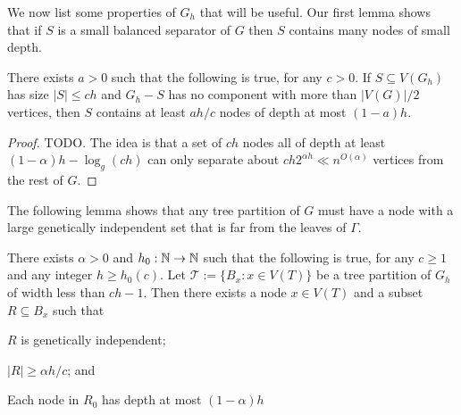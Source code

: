 \documentclass{patmorin}
\begin{document}
We now list some properties of $G_h$ that will be useful.  
Our first lemma shows that if $S$ is a small balanced separator of $G$ then $S$ contains many nodes of small depth.

\begin{lem}\label{small_depth_separator}
  There exists $a >0$ such that the following is true, for any $c>0$.
  If $S\subseteq V(G_h)$ has size $|S|\le ch$ and $G_h-S$ has no component with more than $|V(G)|/2$ vertices, then $S$ contains at least $ah/c$ nodes of depth at most $(1-a)h$. 
\end{lem}

\begin{proof}
  TODO. The idea is that a set of $ch$ nodes all of depth at least $(1-\alpha)h-\log_g(ch)$ can only separate about $ch2^{\alpha h}\ll n^{O(\alpha)}$ vertices from the rest of $G$.
\end{proof}


The following lemma shows that any tree partition of $G$ must have a node with a large genetically independent set that is far from the leaves of $\Gamma$.

\begin{lem}\label{startup}
  There exists $\alpha >0$ and $h_0:\mathbb{N}\to\mathbb{N}$ such that the following is true, for any $c\ge 1$ and any integer $h\ge h_0(c)$.  Let $\mathcal{T}:=\{B_x:x\in V(T)\}$ be a tree partition of $G_h$ of width less than $ch-1$.  Then there exists a node $x\in V(T)$ and a subset $R\subseteq B_x$ such that
  \begin{compactenum}[(i)]
    \item $R$ is genetically independent;
    \item $|R|\ge \alpha h/c$; and
    \item Each node in $R_0$ has depth at most $(1-\alpha)h$ 
  \end{compactenum}
\end{lem}
\end{document}
